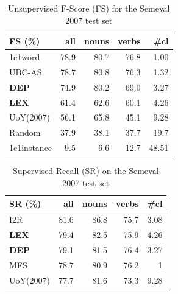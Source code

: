 \begin{table}[!htb]
\centering

\begin{tabular}{@{}lrrrr@{}}
\toprule
\textbf{FS (\%)} & \textbf{all} & \textbf{nouns} & \textbf{verbs} & \textbf{\#cl} \\ \midrule
1c1word          & 78.9         & 80.7           & 76.8           & 1.00             \\
UBC-AS           & 78.7         & 80.8           & 76.3           & 1.32          \\
\textbf{DEP}     & 74.9         & 80.2           & 69.0           & 3.27          \\
\textbf{LEX}     & 61.4         & 62.6           & 60.1           & 4.26         \\
UoY(2007)        & 56.1         & 65.8           & 45.1           & 9.28          \\
Random           & 37.9         & 38.1           & 37.7           & 19.7             \\
1c1instance & 	9.5         & 6.6           & 12.7           & 48.51             \\ \bottomrule
\end{tabular}
\caption{Unsupervised F-Score (FS) for the Semeval 2007 test set}
\label{tab:sem2007_unsup_FS}
\end{table}
 

\begin{table}[!htb]
\centering

\begin{tabular}{@{}lrrrr@{}}
\toprule
\textbf{SR (\%)} & \textbf{all} & \textbf{nouns} & \textbf{verbs} & \textbf{\#cl} \\ \midrule
I2R & 81.6 & 86.8 & 75.7 & 3.08 \\
\textbf{LEX} & 79.4 & 82.5 & 75.9 & 4.26 \\
\textbf{DEP} & 79.1 & 81.5 & 76.4 & 3.27\\
MFS & 78.7 & 80.9 & 76.2 & 1 \\
UoY(2007) & 77.7 & 81.6 & 73.3 & 9.28 \\ \bottomrule
\end{tabular}
\caption{Supervised Recall (SR) on the Semeval 2007 test set}
\label{tab:sem2007_sup_recall}
\end{table}



